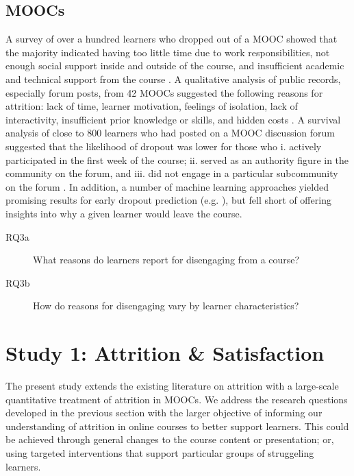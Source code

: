 \documentclass{sigchi}\usepackage[]{graphicx}\usepackage[]{color}
\begin{document}
\subsection{MOOCs}

A survey of over a hundred learners who dropped out of a MOOC showed that the majority indicated having too little time due to work responsibilities, not enough social support inside and outside of the course, and insufficient academic and technical support from the course \cite{gutl2014attrition}. A qualitative analysis of public records, especially forum posts, from 42 MOOCs suggested the following reasons for attrition: lack of time, learner motivation, feelings of isolation, lack of interactivity, insufficient prior knowledge or skills, and hidden costs \cite{khalil2014moocs}. A survival analysis of close to 800 learners who had posted on a MOOC discussion forum suggested that the likelihood of dropout was lower for those who i. actively participated in the first week of the course; ii. served as an authority figure in the community on the forum, and iii. did not engage in a particular subcommunity on the forum \cite{yang2013turn}. In addition, a number of machine learning approaches yielded promising results for early dropout prediction (e.g. \cite{taylor2014likely,halawa2014dropout}), but fell short of offering insights into why a given learner would leave the course.

\begin{description}
\item[RQ3a] What reasons do learners report for disengaging from a course?
\item[RQ3b] How do reasons for disengaging vary by learner characteristics?
\end{description}  

\section{Study 1: Attrition \& Satisfaction}

The present study extends the existing literature on attrition with a large-scale quantitative treatment of attrition in MOOCs. We address the research questions developed in the previous section with the larger objective of informing our understanding of attrition in online courses to better support learners. This could be achieved through general changes to the course content or presentation; or, using targeted interventions that support particular groups of struggeling learners.
\end{document}
